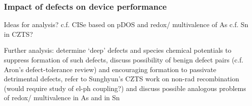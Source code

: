 \documentclass[11pt, twoside]{report}
\begin{document}
\subsubsection{Impact of defects on device performance}

Ideas for analysis? c.f. CISe based on pDOS and redox/ multivalence of As c.f. Sn in CZTS?

Further analysis: determine `deep' defects and species chemical potentials to suppress formation of such defects, discuss possibility of benign defect pairs (c.f. Aron's defect-tolerance review) and encouraging formation to passivate detrimental defects, refer to Sunghyun's CZTS work on non-rad recombination (would require study of el-ph coupling?) and discuss possible analogous problems of redox/ multivalence in As and in Sn










\end{document}
